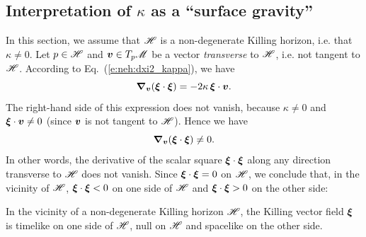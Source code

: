 \subsection{Interpretation of $\kappa$ as a ``surface gravity''}
\label{s:neh:surface_gravity}

In this section, we assume that $\mathscr{H}$ is a non-degenerate Killing horizon,
i.e. that $\kappa\not=0$.
Let $p\in\mathscr{H}$ and $\bm{v}\in T_p\mathscr{M}$ be a vector \emph{transverse} to $\mathscr{H}$, i.e.
not tangent to $\mathscr{H}$. According to Eq.~(\ref{e:neh:dxi2_kappa}), we have
\[
    \bm{\nabla}_{\bm{v}} (\bm{\xi}\cdot\bm{\xi}) = - 2\kappa \, \bm{\xi}\cdot\bm{v} .
\]
The right-hand side of this expression does not vanish, because
$\kappa\not=0$ and $\bm{\xi}\cdot\bm{v} \not=0$ (since $\bm{v}$ is not
tangent to $\mathscr{H}$). Hence we have
\[
    \bm{\nabla}_{\bm{v}} (\bm{\xi}\cdot\bm{\xi}) \not= 0 .
\]
In other words, the derivative of the scalar square $\bm{\xi}\cdot\bm{\xi}$
along any direction transverse to $\mathscr{H}$ does not vanish. Since
$\bm{\xi}\cdot\bm{\xi}=0$ on $\mathscr{H}$, we conclude that, in the vicinity of $\mathscr{H}$,
$\bm{\xi}\cdot\bm{\xi}<0$ on one side of $\mathscr{H}$ and $\bm{\xi}\cdot\bm{\xi}>0$ on the
other side:
\begin{prop}
In the vicinity of a non-degenerate Killing horizon $\mathscr{H}$, the Killing vector field $\bm{\xi}$ is timelike on one side of $\mathscr{H}$, null on $\mathscr{H}$
and spacelike on the other side.
\end{prop}

